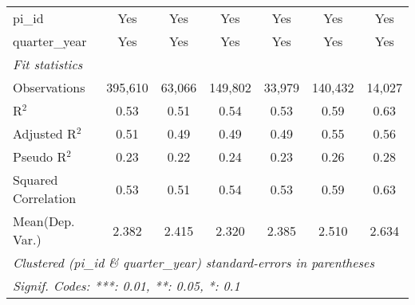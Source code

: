 \begin{tabular}{lcccccc}
   pi\_id                                                     & Yes           & Yes           & Yes           & Yes           & Yes           & Yes\\  
   quarter\_year                                              & Yes           & Yes           & Yes           & Yes           & Yes           & Yes\\  
   \midrule
   \emph{Fit statistics}\\
   Observations                                               & 395,610       & 63,066        & 149,802       & 33,979        & 140,432       & 14,027\\  
   R$^2$                                                      & 0.53          & 0.51          & 0.54          & 0.53          & 0.59          & 0.63\\  
   Adjusted R$^2$                                             & 0.51          & 0.49          & 0.49          & 0.49          & 0.55          & 0.56\\  
   Pseudo R$^2$                                               & 0.23          & 0.22          & 0.24          & 0.23          & 0.26          & 0.28\\  
   Squared Correlation                                        & 0.53          & 0.51          & 0.54          & 0.53          & 0.59          & 0.63\\  
Mean(Dep. Var.) & 2.382 & 2.415 & 2.320 & 2.385 & 2.510 & 2.634 \\
   \midrule \midrule
   \multicolumn{7}{l}{\emph{Clustered (pi\_id \& quarter\_year) standard-errors in parentheses}}\\
   \multicolumn{7}{l}{\emph{Signif. Codes: ***: 0.01, **: 0.05, *: 0.1}}\\
\end{tabular}
\par\endgroup
